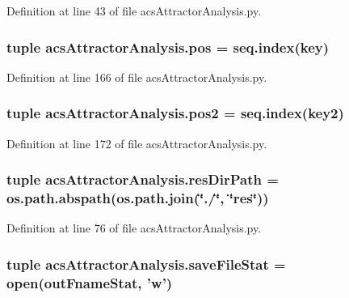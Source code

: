 Definition at line 43 of file acs\-Attractor\-Analysis.\-py.

\hypertarget{a00122_abae060beb170fe923fc10b75f9e82079}{
\subsubsection[{pos}]{\setlength{\rightskip}{0pt plus 5cm}tuple acs\-Attractor\-Analysis.\-pos = {\bf seq.\-index}(key)}}\label{a00122_abae060beb170fe923fc10b75f9e82079}


Definition at line 166 of file acs\-Attractor\-Analysis.\-py.

\hypertarget{a00122_a6ab79d8205f5d0ae2da47fb0af93149a}{
\subsubsection[{pos2}]{\setlength{\rightskip}{0pt plus 5cm}tuple acs\-Attractor\-Analysis.\-pos2 = {\bf seq.\-index}(key2)}}\label{a00122_a6ab79d8205f5d0ae2da47fb0af93149a}


Definition at line 172 of file acs\-Attractor\-Analysis.\-py.

\hypertarget{a00122_a35eb3b681c7408f1476b92798d4f2c16}{
\subsubsection[{res\-Dir\-Path}]{\setlength{\rightskip}{0pt plus 5cm}tuple acs\-Attractor\-Analysis.\-res\-Dir\-Path = os.\-path.\-abspath(os.\-path.\-join(\char`\"{}./\char`\"{}, \char`\"{}res\char`\"{}))}}\label{a00122_a35eb3b681c7408f1476b92798d4f2c16}


Definition at line 76 of file acs\-Attractor\-Analysis.\-py.

\hypertarget{a00122_acc1016f353d0e1b36c837cb0b480edef}{
\subsubsection[{save\-File\-Stat}]{\setlength{\rightskip}{0pt plus 5cm}tuple acs\-Attractor\-Analysis.\-save\-File\-Stat = open({\bf out\-Fname\-Stat}, 'w')}}\label{a00122_acc1016f353d0e1b36c837cb0b480edef}



